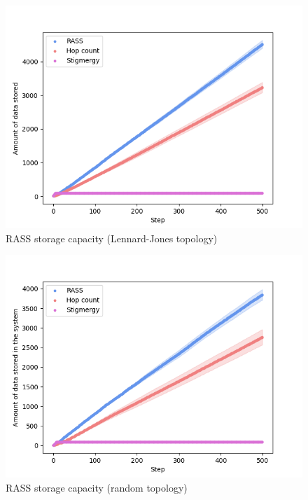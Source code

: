 \begin{figure}
    \includegraphics[width=16cm]{figures/dora_mesh/lennard_storage.png}
        \caption{RASS storage capacity (Lennard-Jones topology)}
        \label{results:lennard_100_storage}
\end{figure}

\begin{figure}
    \centering
    \includegraphics[width=16cm]{figures/dora_mesh/random_storage.png}
    \caption{RASS storage capacity (random topology)}
    \label{results:random_100_storage}
\end{figure}



